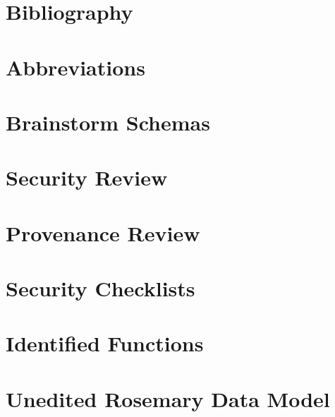 \documentclass[a4paper]{report}
\begin{document}
	
	
	
	
	
	
	\clearpage
	
	\chapter{Bibliography}
	\printbibliography[heading=none]
	
	\appendix
	\chapter{Abbreviations}
	\label{abbreviations}
	
	
	
	\chapter{Brainstorm Schemas}
	\label{brainstorm-before-after}
	
	
	
	\chapter{Security Review}
	\label{security-review-appendix}
	
	
	
	
	
	\chapter{Provenance Review}
	\label{provenance-review-appendix}
	
	
	
	\chapter{Security Checklists}
	\label{security-appendix}
	
	
	
	\chapter{Identified Functions}
	\label{identified-functions}
	
	
	
	\chapter{Unedited Rosemary Data Model}
	\label{unedited-datamodel}
	
	
\end{document}

